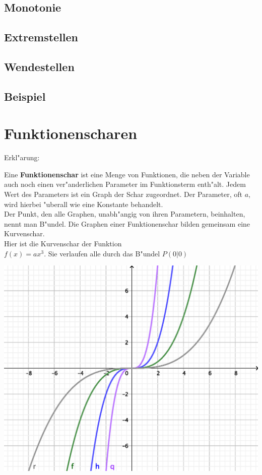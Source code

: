 \subsection{Monotonie}

\subsection{Extremstellen}

\subsection{Wendestellen}

\subsection{Beispiel}

	\section{Funktionenscharen}


Erkl"arung:\\

\begin{minipage}[b]{0.5\linewidth}
Eine \textbf{Funktionenschar} ist eine Menge von Funktionen, die neben der Variable auch noch einen ver"anderlichen Parameter im Funktionsterm enth"alt. Jedem Wert des Parameters ist ein Graph der Schar zugeordnet. Der Parameter, oft $a$, wird hierbei "uberall wie eine Konstante behandelt.\\
Der Punkt, den alle Graphen, unabh"angig von ihren Parametern, beinhalten, nennt man B"undel. Die Graphen einer
Funktionenschar bilden gemeinsam eine Kurvenschar.\\
Hier ist die Kurvenschar der Funktion\\ $f(x)=ax^3$. Sie verlaufen alle durch das B"undel $P(0|0)$
\end{minipage}
\hfill
\begin{minipage}[b]{0.4\linewidth}
\includegraphics[height=12\baselineskip]{kap3/BundelFunktionenscharen.eps}
\end{minipage}
